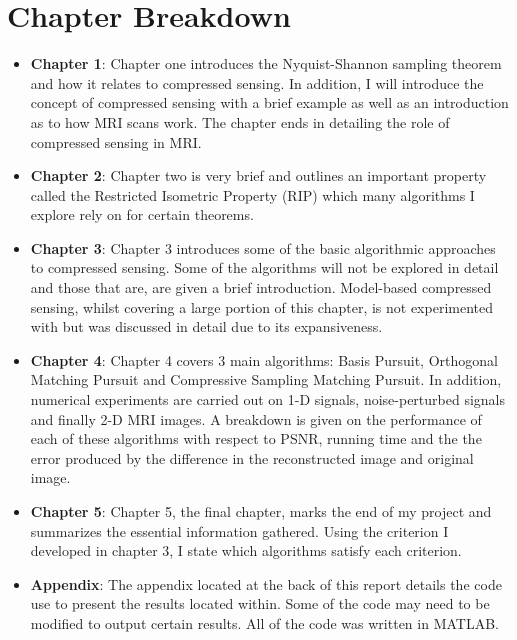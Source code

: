 \documentclass[titlepage,oneside, 12pt]{book}
\theoremstyle{break}
\begin{document}
\section*{Chapter Breakdown}

\begin{itemize}
\item \textbf{Chapter 1}: Chapter one introduces the Nyquist-Shannon sampling theorem and how it relates to compressed sensing. In addition, I will introduce the concept of compressed sensing with a brief example as well as an introduction as to how MRI scans work. The chapter ends in detailing the role of compressed sensing in MRI. 

\item \textbf{Chapter 2}: Chapter two is very brief and outlines an important property called the Restricted Isometric Property (RIP) which many algorithms I explore rely on for certain theorems. 

\item \textbf{Chapter 3}: Chapter 3 introduces some of the basic algorithmic approaches to compressed sensing. Some of the algorithms will not be explored in detail and those that are, are given a brief introduction. Model-based compressed sensing, whilst covering a large portion of this chapter, is not experimented with but was discussed in detail due to its expansiveness. 

\item \textbf{Chapter 4}: Chapter 4 covers 3 main algorithms: Basis Pursuit, Orthogonal Matching Pursuit and Compressive Sampling Matching Pursuit. In addition, numerical experiments are carried out on 1-D signals, noise-perturbed signals and finally 2-D MRI images. A breakdown is given on the performance of each of these algorithms with respect to PSNR, running time and the the error produced by the difference in the reconstructed image and original image. 

\item \textbf{Chapter 5}: Chapter 5, the final chapter, marks the end of my project and summarizes the essential information gathered. Using the criterion I developed in chapter 3, I state which algorithms satisfy each criterion.  

\item \textbf{Appendix}: The appendix located at the back of this report details the code use to present the results located within. Some of the code may need to be modified to output certain results. All of the code was written in MATLAB. 

\end{itemize}
\end{document}
